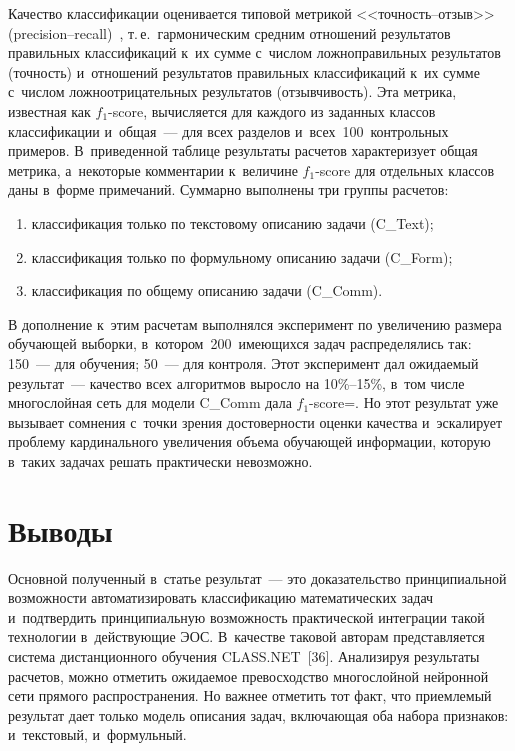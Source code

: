 \begin{multicols}{2}
     Качество классификации оценивается типовой метрикой <<точ\-ность--от\-зыв>> 
     (precision--recall)~\cite{35-bos}, т.\,е.\ гармоническим сред\-ним 
отношений результатов правильных классификаций к~их сумме с~чис\-лом 
ложноправильных результатов (точ\-ность) и~отношений результатов 
правильных классификаций к~их сумме с~чис\-лом ложноотрицательных 
результатов (от\-зыв\-чи\-вость). Эта метрика, известная как $f_1$-score, 
вычисляется для каждого из заданных классов классификации и~общая~--- 
для всех разделов и~всех~100~контрольных примеров. В~приведенной  
таб\-ли\-це результаты расчетов характеризует общая мет\-ри\-ка, а~некоторые 
комментарии к~величине $f_1$-score для отдельных классов даны в~форме 
примечаний. Суммарно выполнены три группы расчетов:
\begin{enumerate}[(1)]
\item классификация 
только по текс\-то\-во\-му описанию задачи (C\_Text);
\item классификация только 
по формульному описанию задачи (C\_Form); 
\item классификация по общему 
описанию задачи (C\_Comm).
\end{enumerate}
     

     
     В дополнение к~этим расчетам выполнялся эксперимент по увеличению 
размера обуча\-ющей выборки, в~котором~200~име\-ющих\-ся задач 
распределялись так: 150~--- для обуче\-ния; 50~--- для контроля. Этот 
эксперимент дал ожи\-да\-емый результат~--- качество всех алгоритмов выросло 
на 10\%--15\%, в~том числе многослойная сеть для модели C\_Comm дала  
$f_1$-score\;=. Но этот результат уже вызывает сомнения с~точ\-ки зрения 
до\-сто\-вер\-ности оценки качества и~эскалирует проб\-ле\-му кардинального 
увеличения объема обуча\-ющей информации, которую в~таких задачах 
решать практически не\-воз\-можно.
     
\section{Выводы}

     Основной полученный в~статье результат~--- это доказательство 
принципиальной воз\-мож\-ности автоматизировать классификацию 
математических задач и~под\-твер\-дить принципиальную воз\-мож\-ность 
прак\-ти\-че\-ской интеграции такой технологии в~дей\-ст\-ву\-ющие ЭОС. В~качестве 
таковой авторам пред\-став\-ля\-ет\-ся сис\-те\-ма дистанционного обуче\-ния 
CLASS.NET~[36]. Анализируя результаты расчетов, мож\-но отметить 
ожи\-да\-емое превосходство многослойной нейронной сети прямого 
рас\-про\-стра\-не\-ния. Но важ\-нее отметить тот факт, что при\-ем\-ле\-мый результат 
дает только модель описания задач, вклю\-ча\-ющая оба набора признаков: 
и~текс\-то\-вый, и~формульный.
     


\end{multicols}
